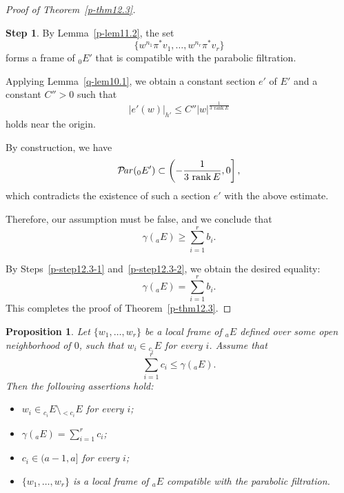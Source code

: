 \documentclass[12pt,twoside]{amsart}
\DeclareMathOperator{\Par}{\mathcal{P}\!\it{ar}}
\newtheorem{prop}[thm]{Proposition}
\theoremstyle{definition}
\newtheorem{step}{Step}
\begin{document}
\begin{proof}[Proof of Theorem~\ref{p-thm12.3}]
\begin{step}
By Lemma~\ref{p-lem11.2}, the set
\[
\{ w^{n_1} \pi^* v_1, \ldots, w^{n_r} \pi^* v_r \}
\]
forms a frame of ${}_0 E'$ that is compatible with the parabolic filtration.

Applying Lemma~\ref{q-lem10.1}, we obtain a 
constant section $e'$ of $E'$ 
and a constant $C'' > 0$ such that
\[
|e'(w)|_{h'} \leq C'' |w|^{\frac{1}{3 \, \operatorname{rank} E}}
\]
holds near the origin.

By construction, we have
\[
\Par({}_0 E') \subset \left( -\frac{1}{3 \, \operatorname{rank} E}, 0 \right],
\]
which contradicts the existence of such a section $e'$ with the above estimate.

Therefore, our assumption must be false, and we conclude that
\[
\gamma({}_a E) \geq \sum_{i=1}^r b_i.
\]
\end{step}

By Steps~\ref{p-step12.3-1} and~\ref{p-step12.3-2}, we obtain the desired equality:
\[
\gamma({}_a E) = \sum_{i=1}^r b_i.
\]
This completes the proof of Theorem~\ref{p-thm12.3}.
\end{proof}

\begin{prop}\label{p-prop12.7} 
Let $\{w_1, \ldots, w_r\}$ be a local frame of ${}_aE$ defined over some 
open 
neighborhood of $0$, such that 
$w_i \in {}_{c_i}E$ for every $i$. Assume that 
\[
\sum_{i=1}^r c_i \leq \gamma({}_a E).
\] 
Then the following assertions hold:
\begin{itemize}
\item[(i)] $w_i \in {}_{c_i}E \setminus {}_{<c_i}E$ for every $i$;
\item[(ii)] $\gamma ({}_a E)=\sum _{i=1}^r c_i$; 
\item[(iii)] $c_i \in (a-1, a]$ for every $i$;
\item[(iv)] $\{w_1, \ldots, w_r\}$ is 
a local frame of ${}_aE$ compatible with the parabolic filtration.
\end{itemize}
\end{prop}
\end{document}

